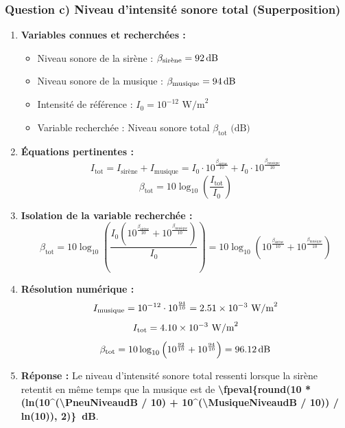 \subsubsection*{Question c) Niveau d'intensité sonore total (Superposition)}

\begin{enumerate}[label=\arabic*)]
    \item \textbf{Variables connues et recherchées :}
    \begin{itemize}[label=-]
        \item Niveau sonore de la sirène : $\beta_{\text{sirène}} = \qty{92}{dB}$
        \item Niveau sonore de la musique : $\beta_{\text{musique}} = \qty{94}{dB}$
        \item Intensité de référence : $I_0 = 10^{-12} \text{ W/m}^2$
        \item Variable recherchée : Niveau sonore total $\beta_{\text{tot}} \text{ (dB)}$
    \end{itemize}

    \item \textbf{Équations pertinentes :}
    \[
    I_{\text{tot}} = I_{\text{sirène}} + I_{\text{musique}} = I_0 \cdot 10^{\frac{\beta_{\text{sirène}}}{10}} + I_0 \cdot 10^{\frac{\beta_{\text{musique}}}{10}}
    \]
    \[
    \beta_{\text{tot}} = 10 \log_{10}\left(\frac{I_{\text{tot}}}{I_0}\right)
    \]

    \item \textbf{Isolation de la variable recherchée :}
    \[
    \beta_{\text{tot}} = 10 \log_{10}\left(\frac{I_0 \left(10^{\frac{\beta_{\text{sirène}}}{10}} + 10^{\frac{\beta_{\text{musique}}}{10}}\right)}{I_0}\right) = 10 \log_{10}\left(10^{\frac{\beta_{\text{sirène}}}{10}} + 10^{\frac{\beta_{\text{musique}}}{10}}\right)
    \]

    \item \textbf{Résolution numérique :}
    \[
    I_{\text{musique}} = 10^{-12} \cdot 10^{\frac{\MusiqueNiveaudB}{10}} = \num[scientific-notation=true, round-mode=figures, round-precision=3]{\fpeval{10^(-12) * 10^(\MusiqueNiveaudB / 10)}} \text{ W/m}^2
    \]
    \[
    I_{\text{tot}} = \num[scientific-notation=true, round-mode=figures, round-precision=3]{\fpeval{10^(-12) * (10^(\PneuNiveaudB / 10) + 10^(\MusiqueNiveaudB / 10))}} \text{ W/m}^2
    \]
    \[
    \beta_{\text{tot}} = 10 \log_{10}\left(10^{\frac{\PneuNiveaudB}{10}} + 10^{\frac{\MusiqueNiveaudB}{10}}\right) = \qty{\fpeval{round(10 * (ln(10^(\PneuNiveaudB / 10) + 10^(\MusiqueNiveaudB / 10)) / ln(10)), 2)}}{dB}
    \]

    \item \textbf{Réponse :}
    Le niveau d'intensité sonore total ressenti lorsque la sirène retentit en même temps que la musique est de \textbf{\qty{\fpeval{round(10 * (ln(10^(\PneuNiveaudB / 10) + 10^(\MusiqueNiveaudB / 10)) / ln(10)), 2)}}{dB}}.
\end{enumerate}
